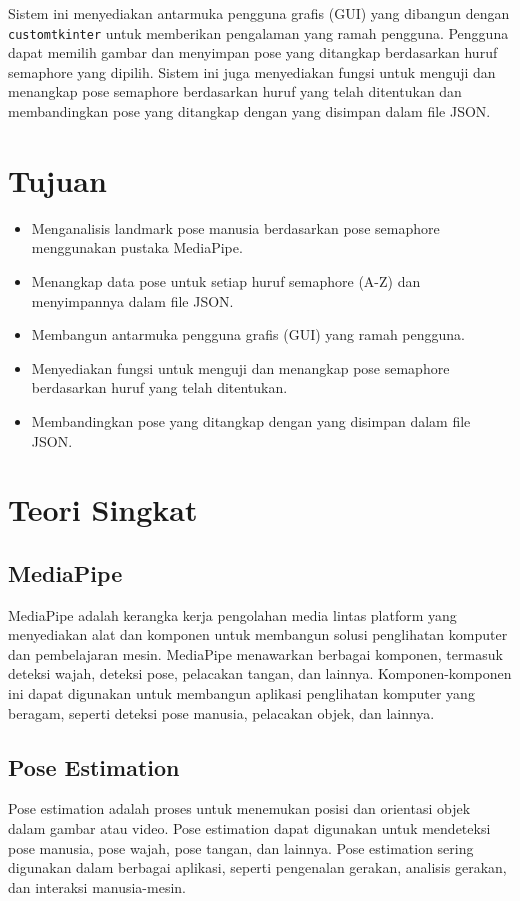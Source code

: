 \documentclass[a4paper,12pt]{article}
\begin{document}
Sistem ini menyediakan antarmuka pengguna grafis (GUI) yang dibangun dengan \texttt{customtkinter} untuk memberikan pengalaman yang ramah pengguna. Pengguna dapat memilih gambar dan menyimpan pose yang ditangkap berdasarkan huruf semaphore yang dipilih. Sistem ini juga menyediakan fungsi untuk menguji dan menangkap pose semaphore berdasarkan huruf yang telah ditentukan dan membandingkan pose yang ditangkap dengan yang disimpan dalam file JSON.

\section{Tujuan}
\begin{itemize}
    \item Menganalisis landmark pose manusia berdasarkan pose semaphore menggunakan pustaka MediaPipe.
    \item Menangkap data pose untuk setiap huruf semaphore (A-Z) dan menyimpannya dalam file JSON.
    \item Membangun antarmuka pengguna grafis (GUI) yang ramah pengguna.
    \item Menyediakan fungsi untuk menguji dan menangkap pose semaphore berdasarkan huruf yang telah ditentukan.
    \item Membandingkan pose yang ditangkap dengan yang disimpan dalam file JSON.
\end{itemize}

\section{Teori Singkat}
\subsection{MediaPipe}
MediaPipe adalah kerangka kerja pengolahan media lintas platform yang menyediakan alat dan komponen untuk membangun solusi penglihatan komputer dan pembelajaran mesin. MediaPipe menawarkan berbagai komponen, termasuk deteksi wajah, deteksi pose, pelacakan tangan, dan lainnya. Komponen-komponen ini dapat digunakan untuk membangun aplikasi penglihatan komputer yang beragam, seperti deteksi pose manusia, pelacakan objek, dan lainnya.

\subsection{Pose Estimation}
Pose estimation adalah proses untuk menemukan posisi dan orientasi objek dalam gambar atau video. Pose estimation dapat digunakan untuk mendeteksi pose manusia, pose wajah, pose tangan, dan lainnya. Pose estimation sering digunakan dalam berbagai aplikasi, seperti pengenalan gerakan, analisis gerakan, dan interaksi manusia-mesin.
\end{document}

